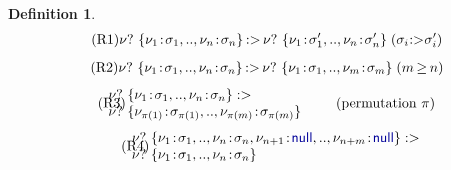 \documentclass[preprint]{sigplanconf}
\newcommand{\kvd}[1]{\textnormal{\textcolor{kvdclr}{\sffamily #1}}}
\newtheorem{definition}{Definition}
\begin{document}
\begin{definition}
\noindent{}
\begin{align}
\hspace{-1em}
\label{eq:sub-record1}\tag{R1}
 \nu?~\{ \nu_1\!:\!\sigma_1, .., \nu_n\!:\!\sigma_n \} \hspace{-0.1em}:> \hspace{-0.1em}
 \nu?~\{ \nu_1\!:\!\sigma_1', .., \nu_n\!:\!\sigma_n' \}
 \; (\sigma_i \hspace{-0.25em}:>\hspace{-0.25em} \sigma_i')
\end{align}
\vspace{-1.4em}
\begin{align}
\hspace{-1em}
\label{eq:sub-record2}\tag{R2}
 \nu?~\{ \nu_1\!:\!\sigma_1, .., \nu_n\!:\!\sigma_n \} \hspace{-0.1em} :> \hspace{-0.1em}
 \nu?~\{ \nu_1\!:\!\sigma_1, .., \nu_m\!:\!\sigma_m \}
 \; (m \hspace{-0.1em}\geq\hspace{-0.1em} n)
\end{align}
\vspace{-1.0em}
\begin{align}
\label{eq:sub-record3}\tag{R3}
\hspace{-1.75em}
\begin{array}{l}
 \nu?~\{ \nu_1\!:\!\sigma_1, .., \nu_n\!:\!\sigma_n \} :> \\
 \nu?~\{ \nu_{\pi(1)}\!:\!\sigma_{\pi(1)}, .., \nu_{\pi(m)}\!:\!\sigma_{\pi(m)} \}
\end{array} \qquad &(\textnormal{permutation}~\pi)
\end{align}
\vspace{-0.6em}
\begin{align}
\label{eq:sub-record4}\tag{R4}
\hspace{-1.75em}
\begin{array}{l}
 \nu?~\{ \nu_1\!:\!\sigma_1, .., \nu_n\!:\!\sigma_n, \nu_{n+1}\!:\!\kvd{null}, .., \nu_{n+m}\!:\!\kvd{null} \} :> \\
 \nu?~\{ \nu_1\!:\!\sigma_1, .., \nu_n\!:\!\sigma_n \}
\end{array}
\end{align}
\end{definition}

\end{document}
